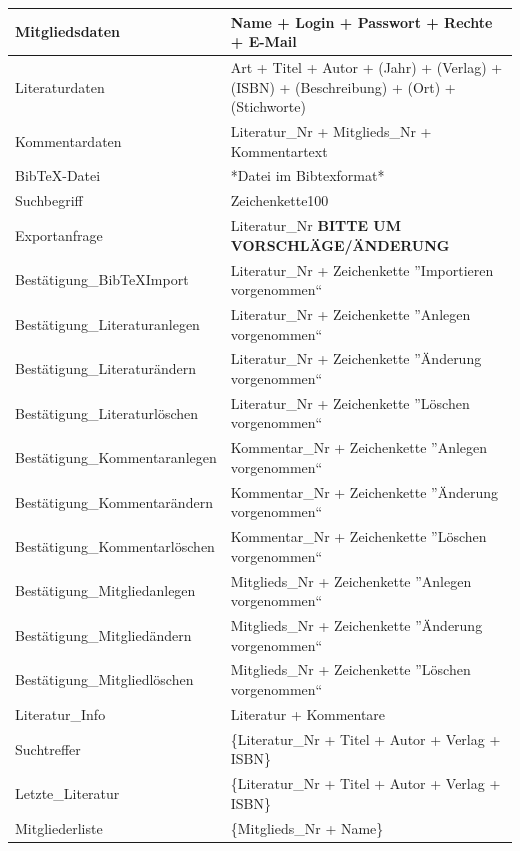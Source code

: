 \begin{longtable}{|l|p{8.5cm}|}
Mitgliedsdaten & Name + Login + Passwort + Rechte + E-Mail\\
\hline
Literaturdaten & Art + Titel + Autor + (Jahr) + (Verlag) + (ISBN) + (Beschreibung) + (Ort) + (Stichworte) \\
\hline
Kommentardaten & Literatur\_Nr + Mitglieds\_Nr + Kommentartext \\
\hline
BibTeX-Datei & *Datei im Bibtexformat* \\
\hline
Suchbegriff & Zeichenkette100 \\
\hline
Exportanfrage & Literatur\_Nr \textbf{BITTE UM VORSCHLÄGE/ÄNDERUNG} \\
\hline\hline

Bestätigung\_BibTeXImport & Literatur\_Nr + Zeichenkette ''Importieren vorgenommen`` \\
\hline
Bestätigung\_Literaturanlegen & Literatur\_Nr + Zeichenkette ''Anlegen vorgenommen`` \\
\hline
Bestätigung\_Literaturändern & Literatur\_Nr + Zeichenkette ''Änderung vorgenommen`` \\
\hline
Bestätigung\_Literaturlöschen & Literatur\_Nr + Zeichenkette ''Löschen vorgenommen`` \\
\hline
Bestätigung\_Kommentaranlegen & Kommentar\_Nr + Zeichenkette ''Anlegen vorgenommen`` \\
\hline
Bestätigung\_Kommentarändern & Kommentar\_Nr + Zeichenkette ''Änderung vorgenommen`` \\
\hline
Bestätigung\_Kommentarlöschen & Kommentar\_Nr + Zeichenkette ''Löschen vorgenommen`` \\
\hline
Bestätigung\_Mitgliedanlegen & Mitglieds\_Nr + Zeichenkette ''Anlegen vorgenommen`` \\
\hline
Bestätigung\_Mitgliedändern & Mitglieds\_Nr + Zeichenkette ''Änderung vorgenommen`` \\
\hline
Bestätigung\_Mitgliedlöschen & Mitglieds\_Nr + Zeichenkette ''Löschen vorgenommen`` \\
\hline
Literatur\_Info & Literatur + Kommentare \\
\hline
Suchtreffer & \{Literatur\_Nr + Titel + Autor + Verlag + ISBN\}\\
\hline
Letzte\_Literatur & \{Literatur\_Nr + Titel + Autor + Verlag + ISBN\}\\
\hline
Mitgliederliste & \{Mitglieds\_Nr + Name\}\\
\hline
\end{longtable}

